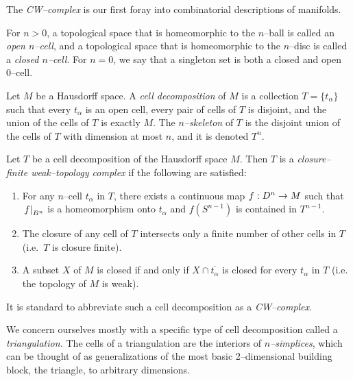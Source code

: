 The \emph{CW--complex} is our first foray into combinatorial descriptions of manifolds.

\begin{defn}
	For $n>0$, a topological space that is homeomorphic to the $n$--ball is called an \emph{open $n$--cell}, and a topological space that is homeomorphic to the $n$--disc is called a \emph{closed $n$--cell}.
	For $n=0$, we say that a singleton set is both a closed and open 0--cell.
	
	Let $M$ be a Hausdorff space.
	A \emph{cell decomposition} of $M$ is a collection $T=\{t_\alpha\}$ such that every $t_\alpha$ is an open cell, every pair of cells of $T$ is disjoint, and the union of the cells of $T$ is exactly $M$.
	The \emph{$n$--skeleton} of $T$ is the disjoint union of the cells of $T$ with dimension at most $n$, and it is denoted $T^n$.
	
	Let $T$ be a cell decomposition of the Hausdorff space $M$.
	Then $T$ is a \emph{closure--finite weak--topology complex} if the following are satisfied: 
	\begin{enumerate}
		\item For any $n$--cell $t_\alpha$ in $T$, there exists a continuous map $f:D^n\to M$ such that $\left.f\right|_{B^n}$ is a homeomorphism onto $t_\alpha$ and $f(S^{n-1})$ is contained in $T^{n-1}$.
		\item The closure of any cell of $T$ intersects only a finite number of other cells in $T$ (i.e.\ $T$ is closure finite).
		\item A subset $X$ of $M$ is closed if and only if $X\cap \overline{t_\alpha}$ is closed for every $t_\alpha$ in $T$ (i.e. the topology of $M$ is weak).		
	\end{enumerate}
	It is standard to abbreviate such a cell decomposition as a \emph{CW--complex}.	
\end{defn}

We concern ourselves mostly with a specific type of cell decomposition called a \emph{triangulation.}
The cells of a triangulation are the interiors of \emph{$n$--simplices}, which can be thought of as generalizations of the most basic 2--dimensional building block, the triangle, to arbitrary dimensions.

